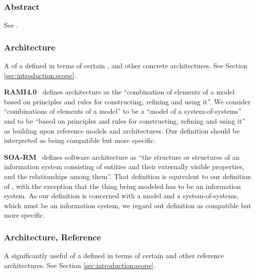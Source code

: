 {

\newcommand{\GlossaryEntry}[3][]{\subsubsection*{#3\IfStrEq{#1}{}{}{ {\normalfont \textit{#1}}}}\label{sec:glossary:#2}}
\newcommand{\GlossaryNote}[2]{\begin{minipage}[b]{\dimexpr\linewidth-0.5cm\relax}\vspace*{0.33cm}\footnotesize{\textbf{#1}\ #2}\end{minipage}}

\GlossaryEntry{abstract}{Abstract}
See .

\GlossaryEntry{architecture}{Architecture}
A  of a  defined in terms of certain ,  and other concrete architectures.
See Section \ref{sec:introduction:scope}.

	\GlossaryNote{RAMI4.0}{
	    defines architecture as the ``combination of elements of a model based on principles and rules for constructing, refining and using it''.
		We consider ``combinations of elements of a model'' to be a ``model of a system-of-systems'' and to be ``based on principles and rules for constructing, refining and using it'' as building upon reference models and architectures.
		Our definition should be interpreted as being compatible but more specific.
	}

	\GlossaryNote{SOA-RM}{
		defines software architecture as ``the structure or structures of an information system consisting of entities and their externally visible properties, and the relationships among them''.
		That definition is equivalent to our definition of \GlossaryHyperRef{model}{model}, with the exception that the thing being modeled has to be an information system.
		As our definition is concerned with a model and a system-of-systems, which must be an information system, we regard out definition as compatible but more specific.
	}

\GlossaryEntry{architecture-reference}{Architecture, Reference}
A significantly useful  of a  defined in terms of certain  and other reference architectures.
See Section \ref{sec:introduction:scope}.

}
